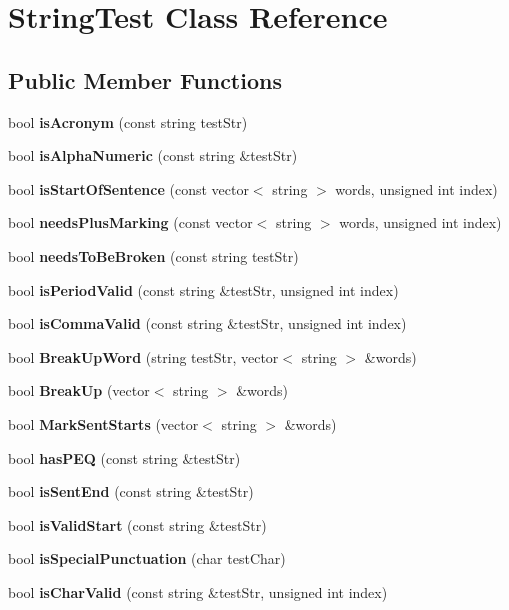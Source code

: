 \section{String\+Test Class Reference}
\label{class_string_test}
\subsection*{Public Member Functions}
\begin{DoxyCompactItemize}
\item 
\mbox{\label{class_string_test_a86ae4d31b108c24bdf653eb8d371d9d2}} 
bool {\bfseries is\+Acronym} (const string test\+Str)
\item 
\mbox{\label{class_string_test_a2cef26f1ea95e585c0173685e2b332d4}} 
bool {\bfseries is\+Alpha\+Numeric} (const string \&test\+Str)
\item 
\mbox{\label{class_string_test_a2e8d790e26957d6a61b3a45052bb6a50}} 
bool {\bfseries is\+Start\+Of\+Sentence} (const vector$<$ string $>$ words, unsigned int index)
\item 
\mbox{\label{class_string_test_ac2c2d2750d47e9886cc92f44c7de35eb}} 
bool {\bfseries needs\+Plus\+Marking} (const vector$<$ string $>$ words, unsigned int index)
\item 
\mbox{\label{class_string_test_a2d0dd5ba349d25f54b36e2bc348f3073}} 
bool {\bfseries needs\+To\+Be\+Broken} (const string test\+Str)
\item 
\mbox{\label{class_string_test_a7ce10114ef880971cdd7d54e93c1afba}} 
bool {\bfseries is\+Period\+Valid} (const string \&test\+Str, unsigned int index)
\item 
\mbox{\label{class_string_test_a00ef80726fa4642cfe1c0045145bd218}} 
bool {\bfseries is\+Comma\+Valid} (const string \&test\+Str, unsigned int index)
\item 
\mbox{\label{class_string_test_ab0435c237688421df5d2415dd61a84b8}} 
bool {\bfseries Break\+Up\+Word} (string test\+Str, vector$<$ string $>$ \&words)
\item 
\mbox{\label{class_string_test_a9018923eede9688a6633940eb8dbfb73}} 
bool {\bfseries Break\+Up} (vector$<$ string $>$ \&words)
\item 
\mbox{\label{class_string_test_a4be4ab92ef9ecfe6d8e86c0fac110c89}} 
bool {\bfseries Mark\+Sent\+Starts} (vector$<$ string $>$ \&words)
\item 
\mbox{\label{class_string_test_a09b57b68a9d8afc338064f9ebfd65f7e}} 
bool {\bfseries has\+P\+EQ} (const string \&test\+Str)
\item 
\mbox{\label{class_string_test_a27cbd7bb493b4289f26b55e353cbaab4}} 
bool {\bfseries is\+Sent\+End} (const string \&test\+Str)
\item 
\mbox{\label{class_string_test_a48aeb482622fe6fe3caeedebdb96ff47}} 
bool {\bfseries is\+Valid\+Start} (const string \&test\+Str)
\item 
\mbox{\label{class_string_test_af2736d02539fc9ddb660f022885738eb}} 
bool {\bfseries is\+Special\+Punctuation} (char test\+Char)
\item 
\mbox{\label{class_string_test_a41ce152057de1b196944da8ddb0b6d25}} 
bool {\bfseries is\+Char\+Valid} (const string \&test\+Str, unsigned int index)
\end{DoxyCompactItemize}
